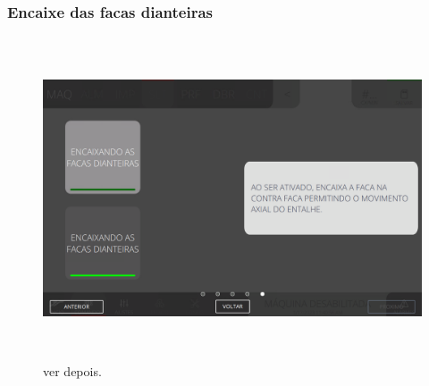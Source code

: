 \newpage
\thispagestyle{fancy}
\vspace*{\fill}
\subsubsection{\small{Encaixe das facas dianteiras}}
\begin{figure}[h]
  \centering
  \includegraphics[width=576px,height=360px]{src/imagesFlexo/05-slotter/commands/e-5.png}
  \caption{ver depois.}
   \label{}
\end{figure}
\vspace*{\fill}

